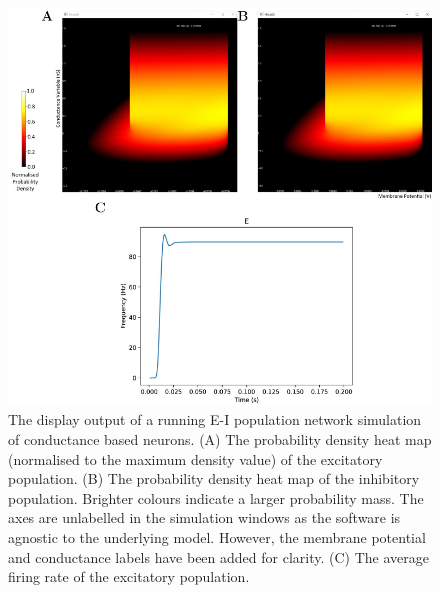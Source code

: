 \documentclass[utf8]{frontiersSCNS} %
\begin{document}
\begin{figure}[htb!]
  \centering
  \includegraphics[width=\linewidth]{images/cond_full_figure.pdf}
  \caption{The display output of a running E-I population network simulation of conductance based neurons. (A) The probability density heat map (normalised to the maximum density value) of the excitatory population. (B) The probability density heat map of the inhibitory population. Brighter colours indicate a larger probability mass. The axes are unlabelled in the simulation windows as the software is agnostic to the underlying model. However, the membrane potential and conductance labels have been added for clarity. (C) The average firing rate of the excitatory population.}
  \label{fig:quickstart}
\end{figure}
\end{document}

